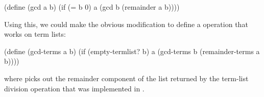 \begin{codeBlock}
(define (gcd a b)
  (if (= b 0)
      a
      (gcd b (remainder a b))))
\end{codeBlock}

\noindent
Using this, we could make the obvious modification to define a 
operation that works on term lists:

\begin{codeBlock}
(define (gcd-terms a b)
  (if (empty-termlist? b)
      a
      (gcd-terms b (remainder-terms a b))))
\end{codeBlock}

\noindent
where  picks out the remainder component of the list
returned by the term-list division operation  that was
implemented in .

